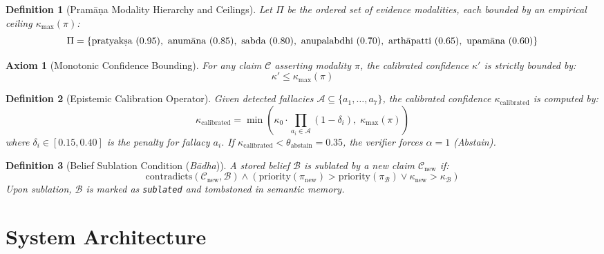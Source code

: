 \documentclass[11pt,a4paper]{article}
\newtheorem{definition}{Definition}
\newtheorem{axiom}{Axiom}
\begin{document}
\begin{definition}[Pram\=a\d{n}a Modality Hierarchy and Ceilings]
Let $\Pi$ be the ordered set of evidence modalities, each bounded by an empirical ceiling $\kappa_{\max}(\pi)$:
\begin{equation}
\Pi = \{ \text{pratyak\d{s}a}~(0.95),~\text{anum\=ana}~(0.85),~\text{sabda}~(0.80),~\text{anupalabdhi}~(0.70),~\text{arth\=apatti}~(0.65),~\text{upam\=ana}~(0.60) \}
\end{equation}
\end{definition}

\begin{axiom}[Monotonic Confidence Bounding]
For any claim $\mathcal{C}$ asserting modality $\pi$, the calibrated confidence $\kappa'$ is strictly bounded by:
\begin{equation}
\kappa' \le \kappa_{\max}(\pi)
\end{equation}
\end{axiom}

\begin{definition}[Epistemic Calibration Operator]
Given detected fallacies $\mathcal{A} \subseteq \{a_1, \dots, a_7\}$, the calibrated confidence $\kappa_{\text{calibrated}}$ is computed by:
\begin{equation}
\kappa_{\text{calibrated}} = \min \left( \kappa_0 \cdot \prod_{a_i \in \mathcal{A}} (1 - \delta_i), \; \kappa_{\max}(\pi) \right)
\end{equation}
where $\delta_i \in [0.15, 0.40]$ is the penalty for fallacy $a_i$. If $\kappa_{\text{calibrated}} < \theta_{\text{abstain}} = 0.35$, the verifier forces $\alpha = 1$ (Abstain).
\end{definition}

\begin{definition}[Belief Sublation Condition (\textit{B\=adha})]
A stored belief $\mathcal{B}$ is sublated by a new claim $\mathcal{C}_{\text{new}}$ if:
\begin{equation}
\text{contradicts}(\mathcal{C}_{\text{new}}, \mathcal{B}) \land \left( \text{priority}(\pi_{\text{new}}) > \text{priority}(\pi_{\mathcal{B}}) \lor \kappa_{\text{new}} > \kappa_{\mathcal{B}} \right)
\end{equation}
Upon sublation, $\mathcal{B}$ is marked as \texttt{sublated} and tombstoned in semantic memory.
\end{definition}

\section{System Architecture}
\end{document}
